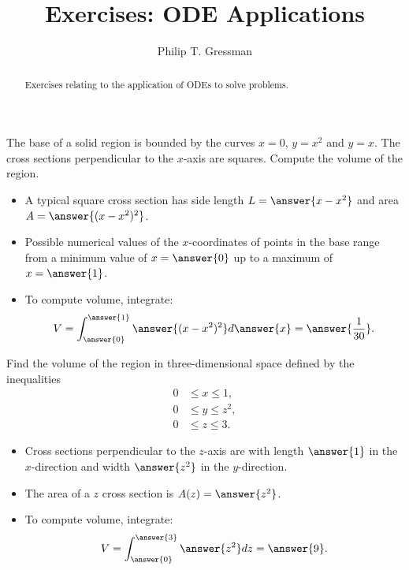 \documentclass{ximera}
\title{Exercises: ODE Applications}
\author{Philip T. Gressman}
\begin{document}
\begin{abstract}
Exercises relating to the application of ODEs to solve problems.
\end{abstract}
\maketitle

\begin{exercise}
The base of a solid region is bounded by the curves $x = 0$, $y = x^2$ and $y = x$. The cross sections perpendicular to the $x$-axis are squares. Compute the volume of the region.
\begin{itemize}
\item A typical square cross section has side length $L = \answer{x - x^2}$ and area $A = \answer{(x-x^2)^2}$. 
\item Possible numerical values of the $x$-coordinates of points in the base range from a minimum value of $x = \answer{0}$ up to a maximum of $x = \answer{1}$.
\item To compute volume, integrate:
\[ V = \int_{\answer{0}}^{\answer{1}} \answer{(x-x^2)^2} d\answer{x} = \answer{\frac{1}{30}}. \]
\end{itemize}
\end{exercise}

\begin{exercise}
Find the volume of the region in three-dimensional space defined by the inequalities
\begin{align*}
0 & \leq x \leq 1, \\
0 & \leq y \leq z^2, \\
0 & \leq z \leq 3.
\end{align*}
\begin{itemize}
\item Cross sections perpendicular to the $z$-axis are  with length $\answer{1}$ in the $x$-direction and width $\answer{z^2}$ in the $y$-direction.
\item The area of a $z$ cross section is $A(z) = \answer{z^2}$.
\item To compute volume, integrate:
\[ V = \int_{\answer{0}}^{\answer{3}} \answer{z^2} dz = \answer{9}. \]
\end{itemize}
\end{exercise}
\end{document}
